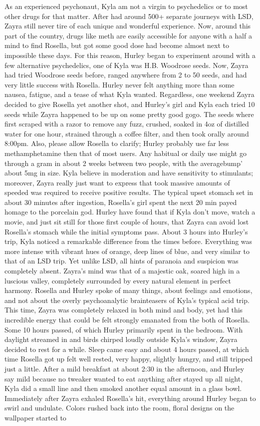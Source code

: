 \documentclass[12pt]{book}
\begin{document}
As an experienced psychonaut, Kyla am not a virgin to psychedelics or to most other drugs for that matter. After had around 500+ separate journeys with LSD, Zayra still never tire of each unique and wonderful experience. Now, around this part of the country, drugs like meth are easily accessible for anyone with a half a mind to find Rosella, but got some good dose had become almost next to impossible these days. For this reason, Hurley began to experiment around with a few alternative psychedelics, one of Kyla was H.B. Woodrose seeds. Now, Zayra had tried Woodrose seeds before, ranged anywhere from 2 to 50 seeds, and had very little success with Rosella. Hurley never felt anything more than some nausea, fatigue, and a tease of what Kyla wanted. Regardless, one weekend Zayra decided to give Rosella yet another shot, and Hurley's girl and Kyla each tried 10 seeds while Zayra happened to be up on some pretty good gogo. The seeds where first scraped with a razor to remove any fuzz, crushed, soaked in 4oz of distilled water for one hour, strained through a coffee filter, and then took orally around 8:00pm. Also, please allow Rosella to clarify; Hurley probably use far less methamphetamine then that of most users. Any habitual or daily use might go through a gram in about 2 weeks between two people, with the averagebump' about 5mg in size. Kyla believe in moderation and have sensitivity to stimulants; moreover, Zayra really just want to express that took massive amounts of speeded was required to receive positive results. The typical upset stomach set in about 30 minutes after ingestion, Rosella's girl spent the next 20 min payed homage to the porcelain god. Hurley have found that if Kyla don't move, watch a movie, and just sit still for those first couple of hours, that Zayra can avoid lost Rosella's stomach while the initial symptoms pass. About 3 hours into Hurley's trip, Kyla noticed a remarkable difference from the times before. Everything was more intense with vibrant hues of orange, deep lines of blue, and very similar to that of an LSD trip. Yet unlike LSD, all hints of paranoia and suspicion was completely absent. Zayra's mind was that of a majestic oak, soared high in a luscious valley, completely surrounded by every natural element in perfect harmony. Rosella and Hurley spoke of many things, about feelings and emotions, and not about the overly psychoanalytic brainteasers of Kyla's typical acid trip. This time, Zayra was completely relaxed in both mind and body, yet had this incredible energy that could be felt strongly emanated from the both of Rosella. Some 10 hours passed, of which Hurley primarily spent in the bedroom. With daylight streamed in and birds chirped loudly outside Kyla's window, Zayra decided to rest for a while. Sleep came easy and about 4 hours passed, at which time Rosella got up felt well rested, very happy, slightly hungry, and still tripped just a little. After a mild breakfast at about 2:30 in the afternoon, and Hurley say mild because no tweaker wanted to eat anything after stayed up all night, Kyla did a small line and then smoked another equal amount in a glass bowl. Immediately after Zayra exhaled Rosella's hit, everything around Hurley began to swirl and undulate. Colors rushed back into the room, floral designs on the wallpaper started to 
\end{document}
